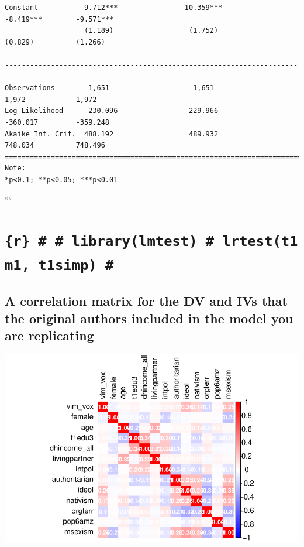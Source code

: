 \documentclass[
  letterpaper,
  DIV=11,
  numbers=noendperiod]{scrartcl}
\begin{document}
\begin{verbatim}
Constant          -9.712***               -10.359***               -8.419***        -9.571***       
                   (1.189)                  (1.752)                 (0.829)          (1.266)        
                                                                                                    
----------------------------------------------------------------------------------------------------
Observations        1,651                    1,651                   1,972            1,972         
Log Likelihood     -230.096                -229.966                 -360.017         -359.248       
Akaike Inf. Crit.  488.192                  489.932                 748.034          748.496        
====================================================================================================
Note:                                                                    *p<0.1; **p<0.05; ***p<0.01
\end{verbatim}

```

\section{\texorpdfstring{\texttt{\{r\}\ \#\ \#\ library(lmtest)\ \#\ lrtest(t1m1,\ t1simp)\ \#}}{\{r\} \# \# library(lmtest) \# lrtest(t1m1, t1simp) \#}}\label{r-librarylmtest-lrtestt1m1-t1simp}

\subsection{A correlation matrix for the DV and IVs that the original
authors included in the model you are
replicating}\label{a-correlation-matrix-for-the-dv-and-ivs-that-the-original-authors-included-in-the-model-you-are-replicating}

\includegraphics{reprod_sexism_files/figure-pdf/unnamed-chunk-9-1.pdf}
\end{document}
